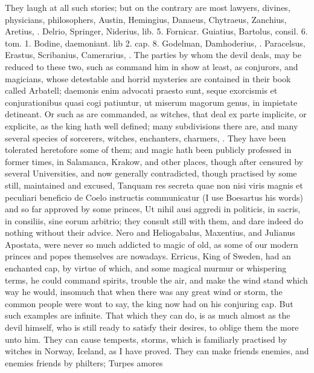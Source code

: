 {They laugh at all such stories; but on the contrary are most lawyers,
divines, physicians, philosophers, Austin, Hemingius, Danaeus,
Chytraeus, Zanchius, Aretius, \etc{}. Delrio, Springer, Niderius,
lib. 5. Fornicar. Guiatius, Bartolus, consil. 6. tom. 1. Bodine,
daemoniant. lib 2. cap. 8. Godelman, Damhoderius, \etc{}. Paracelsus,
Erastus, Scribanius, Camerarius, \etc{}. The parties by whom the devil
deals, may be reduced to these two, such as command him in show at
least, as conjurors, and magicians, whose detestable and horrid
mysteries are contained in their book called Arbatell; daemonis
enim advocati praesto sunt, seque exorcismis et conjurationibus quasi
cogi patiuntur, ut miserum magorum genus, in impietate detineant. Or
such as are commanded, as witches, that deal ex parte implicite, or
explicite, as the king hath well defined; many subdivisions there
are, and many several species of sorcerers, witches, enchanters,
charmers, \etc{}. They have been tolerated heretofore some of them; and
magic hath been publicly professed in former times, in Salamanca,
Krakow, and other places, though after censured by several
Universities, and now generally contradicted, though practised by
some still, maintained and excused, Tanquam res secreta quae non nisi
viris magnis et peculiari beneficio de Coelo instructis communicatur (I
use Boesartus his words) and so far approved by some princes, Ut
nihil ausi aggredi in politicis, in sacris, in consiliis, sine eorum
arbitrio; they consult still with them, and dare indeed do nothing
without their advice. Nero and Heliogabalus, Maxentius, and Julianus
Apostata, were never so much addicted to magic of old, as some of our
modern princes and popes themselves are nowadays. Erricus, King of
Sweden, had an enchanted cap, by virtue of which, and some
magical murmur or whispering terms, he could command spirits, trouble
the air, and make the wind stand which way he would, insomuch that when
there was any great wind or storm, the common people were wont to say,
the king now had on his conjuring cap. But such examples are infinite.
That which they can do, is as much almost as the devil himself, who is
still ready to satisfy their desires, to oblige them the more unto him.
They can cause tempests, storms, which is familiarly practised by
witches in Norway, Iceland, as I have proved. They can make friends
enemies, and enemies friends by philters; Turpes amores
}
